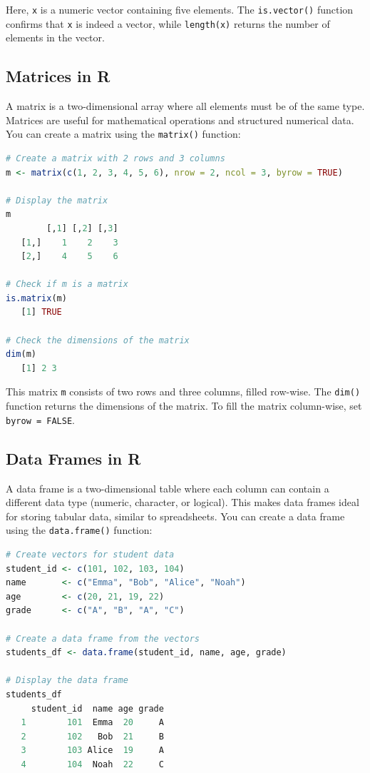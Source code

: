 \documentclass[
]{book}
\newcommand{\passthrough}[1]{#1}
\theoremstyle{definition}
\theoremstyle{definition}
\theoremstyle{definition}
\theoremstyle{definition}
\theoremstyle{remark}
\begin{document}
Here, \passthrough{\lstinline!x!} is a numeric vector containing five elements. The \passthrough{\lstinline!is.vector()!} function confirms that \passthrough{\lstinline!x!} is indeed a vector, while \passthrough{\lstinline!length(x)!} returns the number of elements in the vector.

\subsection*{Matrices in R}\label{matrices-in-r}

A matrix is a two-dimensional array where all elements must be of the same type. Matrices are useful for mathematical operations and structured numerical data. You can create a matrix using the \passthrough{\lstinline!matrix()!} function:

\begin{lstlisting}[language=R]
# Create a matrix with 2 rows and 3 columns
m <- matrix(c(1, 2, 3, 4, 5, 6), nrow = 2, ncol = 3, byrow = TRUE)

# Display the matrix
m
        [,1] [,2] [,3]
   [1,]    1    2    3
   [2,]    4    5    6

# Check if m is a matrix
is.matrix(m)
   [1] TRUE

# Check the dimensions of the matrix
dim(m)
   [1] 2 3
\end{lstlisting}

This matrix \passthrough{\lstinline!m!} consists of two rows and three columns, filled row-wise. The \passthrough{\lstinline!dim()!} function returns the dimensions of the matrix. To fill the matrix column-wise, set \passthrough{\lstinline!byrow = FALSE!}.

\subsection*{Data Frames in R}\label{data-frames-in-r}

A data frame is a two-dimensional table where each column can contain a different data type (numeric, character, or logical). This makes data frames ideal for storing tabular data, similar to spreadsheets. You can create a data frame using the \passthrough{\lstinline!data.frame()!} function:

\begin{lstlisting}[language=R]
# Create vectors for student data
student_id <- c(101, 102, 103, 104)
name       <- c("Emma", "Bob", "Alice", "Noah")
age        <- c(20, 21, 19, 22)
grade      <- c("A", "B", "A", "C")

# Create a data frame from the vectors
students_df <- data.frame(student_id, name, age, grade)

# Display the data frame
students_df
     student_id  name age grade
   1        101  Emma  20     A
   2        102   Bob  21     B
   3        103 Alice  19     A
   4        104  Noah  22     C
\end{lstlisting}
\end{document}
